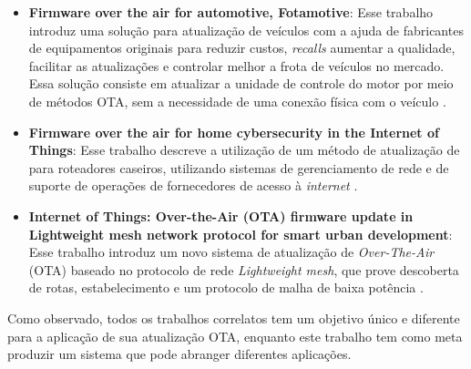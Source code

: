 \begin{itemize}

    \item \textbf{Firmware over the air for automotive, Fotamotive}: Esse trabalho introduz uma solução para atualização de veículos com a ajuda de fabricantes de equipamentos originais para reduzir custos, \textit{recalls} aumentar a qualidade, facilitar as atualizações e controlar melhor a frota de veículos no mercado. Essa solução consiste em atualizar a unidade de controle do motor por meio de métodos OTA, sem a necessidade de uma conexão física com o veículo \cite{Odat2014}.

    \item \textbf{Firmware over the air for home cybersecurity in the Internet of Things}: Esse trabalho descreve a utilização de um método de atualização de \firmware para roteadores caseiros, utilizando sistemas de gerenciamento de rede e de suporte de operações de fornecedores de acesso à \textit{internet} \cite{Teng2017}.
    
    \item \textbf{Internet of Things: Over-the-Air (OTA) firmware update in Lightweight mesh network protocol for smart urban development}: Esse trabalho introduz um novo sistema de atualização de \firmware \textit{Over-The-Air} (OTA) baseado no protocolo de rede \textit{Lightweight mesh}, que prove descoberta de rotas, estabelecimento e um protocolo de malha de baixa potência \cite{Chandra2016}.

\end{itemize}

Como observado, todos os trabalhos correlatos tem um objetivo único e diferente para a aplicação de sua atualização OTA, enquanto este trabalho tem como meta produzir um sistema que pode abranger diferentes aplicações.